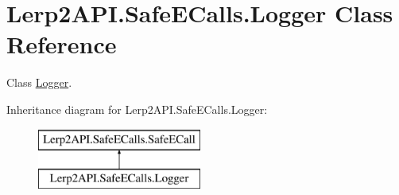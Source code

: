 \hypertarget{class_lerp2_a_p_i_1_1_safe_e_calls_1_1_logger}{}\section{Lerp2\+A\+P\+I.\+Safe\+E\+Calls.\+Logger Class Reference}
\label{class_lerp2_a_p_i_1_1_safe_e_calls_1_1_logger}


Class \hyperlink{class_lerp2_a_p_i_1_1_safe_e_calls_1_1_logger}{Logger}.  


Inheritance diagram for Lerp2\+A\+P\+I.\+Safe\+E\+Calls.\+Logger\+:\begin{figure}[H]
\begin{center}
\leavevmode
\includegraphics[height=2.000000cm]{class_lerp2_a_p_i_1_1_safe_e_calls_1_1_logger}
\end{center}
\end{figure}
